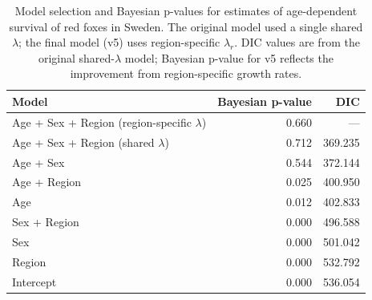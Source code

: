 \documentclass[12pt,a4paper,final,abstract=true,headings=small]{scrartcl}
\begin{document}
\begin{table}[!htbp]
  \centering
  \captionsetup{font=scriptsize}
  \caption{Model selection and Bayesian p-values for estimates of age-dependent
    survival of red foxes in Sweden. The original model used a single
    shared $\lambda$; the final model (v5) uses region-specific
    $\lambda_r$. DIC values are from the original shared-$\lambda$ model;
    Bayesian p-value for v5 reflects the improvement from region-specific
    growth rates.}
  \label{table:DICBP}
  \scriptsize
  \begin{tabular}{lrr}
    \toprule
    Model                                          & Bayesian p-value & DIC     \\
    \midrule
    Age + Sex + Region (region-specific $\lambda$) & 0.660            & ---     \\
    Age + Sex + Region (shared $\lambda$)          & 0.712            & 369.235 \\
    Age + Sex                                      & 0.544            & 372.144 \\
    Age + Region                                   & 0.025            & 400.950 \\
    Age                                            & 0.012            & 402.833 \\
    Sex + Region                                   & 0.000            & 496.588 \\
    Sex                                            & 0.000            & 501.042 \\
    Region                                         & 0.000            & 532.792 \\
    Intercept                                      & 0.000            & 536.054 \\
    \bottomrule
  \end{tabular}
\end{table}
\end{document}
